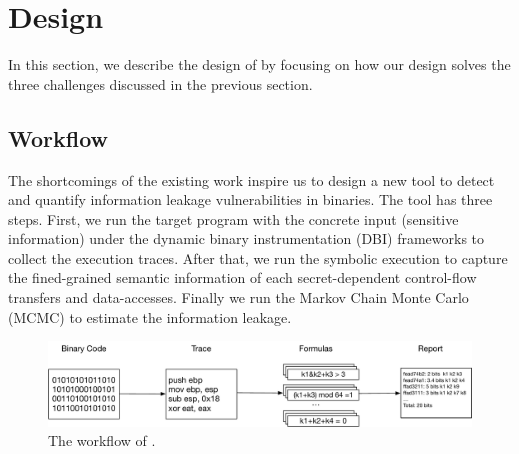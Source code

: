 \section{Design}
In this section, we describe the design of \tool{} by focusing on
how our design solves the three challenges discussed in the previous
section.

\subsection{Workflow}
The shortcomings of the existing work inspire us to design a new tool to detect
and quantify information leakage vulnerabilities in binaries. The tool has three
steps. First, we run the target program with the concrete input 
(sensitive information) under the dynamic binary instrumentation (DBI) frameworks
to collect the execution traces. After that, we run the symbolic execution 
to capture the fined-grained semantic information of each secret-dependent 
control-flow transfers and data-accesses. 
Finally we run the Markov Chain Monte Carlo (MCMC) to estimate the 
information leakage. 

\begin{figure}[ht]
    \centering
    \includegraphics[width=\columnwidth]{./figures/workflow.pdf}
    \caption{The workflow of \tool{}. }
    \label{fig:Test}
\end{figure}

